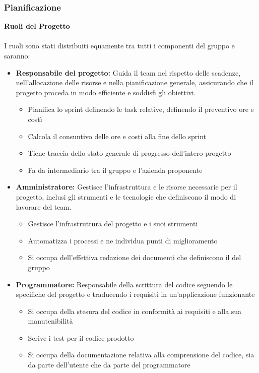 \subsubsection{Pianificazione}
\textbf{Ruoli del Progetto}
\\\\
I ruoli sono stati distribuiti equamente tra tutti i componenti del gruppo e saranno:
\begin{itemize}
	\item \textbf{Responsabile del progetto:} Guida il team nel rispetto delle scadenze, nell'allocazione delle risorse e nella pianificazione generale, assicurando che il progetto proceda in modo efficiente e soddisfi gli obiettivi.
	\begin{itemize}
    \item{Pianifica lo sprint definendo le task relative, definendo il preventivo ore e costì}
    \item{Calcola il consuntivo delle ore e costi alla fine dello sprint}
    \item{Tiene traccia dello stato generale di progresso dell'intero progetto}
    \item{Fa da intermediario tra il gruppo e l'azienda proponente}
  \end{itemize}
	\item \textbf{Amministratore:} Gestisce l'infrastruttura e le risorse necessarie per il progetto, inclusi gli strumenti e le tecnologie che definiscono il modo di lavorare del team.
	\begin{itemize}
    \item{Gestisce l'infrastruttura del progetto e i suoi strumenti}
    \item{Automatizza i processi e ne individua punti di miglioramento}
    \item{Si occupa dell'effettiva redazione dei documenti che definiscono il  del gruppo}
	\end{itemize}
  \item \textbf{Programmatore:} Responsabile della scrittura del codice seguendo le specifiche del progetto e traducendo i requisiti in un'applicazione funzionante
	\begin{itemize}
    \item{Si occupa della stesura del codice in conformità ai requisiti e alla sua manutenibilità}
    \item{Scrive i test per il codice prodotto}
    \item{Si occupa della documentazione relativa alla comprensione del codice, sia da parte dell'utente che da parte del programmatore}

\end{itemize}
\end{itemize}
